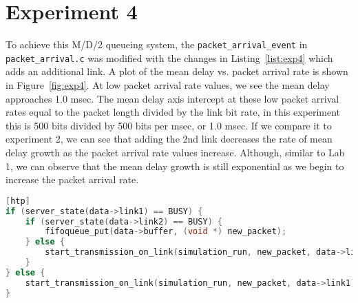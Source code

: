 \section*{Experiment 4}

To achieve this M/D/2 queueing system, the \texttt{packet\_arrival\_event} in \texttt{packet\_arrival.c} was modified with the changes in Listing~\ref{list:exp4} which adds an additional link. A plot of the mean delay vs. packet arrival rate is shown in Figure~\ref{fig:exp4}. At low packet arrival rate values, we see the mean delay approaches 1.0 msec. The mean delay axis intercept at these low packet arrival rates equal to the packet length divided by the link bit rate, in this experiment this is 500 bits divided by 500 bits per msec, or 1.0 msec. If we compare it to experiment 2, we can see that adding the 2nd link decreases the rate of mean delay growth as the packet arrival rate values increase. Although, similar to Lab 1, we can observe that the mean delay growth is still exponential as we begin to increase the packet arrival rate.

\begin{lstlisting}[language=C, caption={Modifications to Experiment 4 Code}, label={list:exp4}][htp]
if (server_state(data->link1) == BUSY) {
    if (server_state(data->link2) == BUSY) {
        fifoqueue_put(data->buffer, (void *) new_packet);
    } else {
        start_transmission_on_link(simulation_run, new_packet, data->link2);
    }
} else {
    start_transmission_on_link(simulation_run, new_packet, data->link1);
}
\end{lstlisting}

